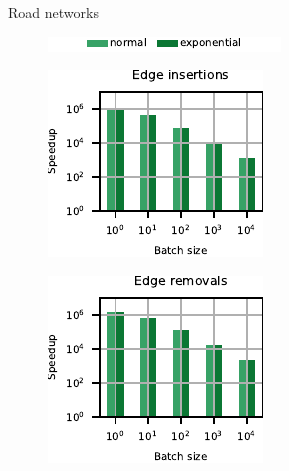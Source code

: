 \begin{figure}[t]
\begin{subfigure}[b]{.5\textwidth}
\begin{subfigure}[b]{.5\textwidth}
\end{subfigure}
\caption{Road networks}
\label{fig:dyn-mwm:speedup-road}
\end{subfigure}\hfill
\begin{subfigure}[b]{.5\textwidth}
\begin{subfigure}[t]{\textwidth}
\centering
\includegraphics{sources/plots/dyn-mwm/legend-cplx.pdf}
\end{subfigure}

\begin{subfigure}[b]{.5\textwidth}
\centering
\includegraphics[width=.9\textwidth]{sources/plots/dyn-mwm/speedup-cplx-insertion.pdf}
\end{subfigure}\hfill
\begin{subfigure}[b]{.5\textwidth}
\centering
\includegraphics[width=.9\textwidth]{sources/plots/dyn-mwm/speedup-cplx-removal.pdf}

\end{subfigure}
\end{subfigure}
\end{figure}
